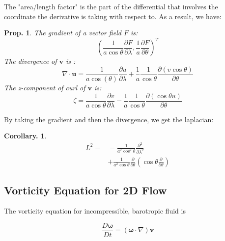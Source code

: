 \documentclass[14pt, twocolumn]{article}
\newtheorem{prop}{Prop.}
\newtheorem{coro}{Corollary.}
\newenvironment{tbox}{
    \begin{tcolorbox}[sharp corners, colback=white]
    
}{
    \end{tcolorbox}
}
\begin{document}
The "area/length factor" is the part of the differential that involves the coordinate the derivative is taking with respect to. 
As a result, we have:
\begin{tbox}
    \begin{prop}
    The gradient of a vector field  $F$ is:
    $$
        \left(\frac{1}{a\cos \theta}\frac{\partial F}{\partial \lambda }, \frac{1}{a}\frac{\partial F}{\partial \theta} \right)^T
    $$
    The divergence of $\mathbf{v}$ is :
    \begin{equation}
    \nabla \cdot \mathbf{u} =\frac{1} {a\cos(\theta)} \frac{\partial u}{\partial \lambda}  + \frac{1}{a}\frac{1}{\cos\theta}\frac{\partial (v\cos\theta)}{\partial \theta}
    \end{equation}
    The z-component of curl of $\mathbf{v}$ is:
    \begin{equation}
        \zeta =  \frac{1}{a\cos \theta}\frac{\partial v}{\partial \lambda } -\frac{1}{a}\frac{1}{\cos \theta}\frac{\partial (\cos \theta u)}{\partial \theta} 
    \end{equation} 
\end{prop}

\end{tbox}
By taking the gradient and then the divergence, we get the laplacian:
\begin{tbox}
    \begin{coro}
        \begin{align*}
            L^2=
                          &= \frac{1}{a^2\cos^2 \theta}\frac{\partial^2}{\partial \lambda^2}  \\
                          &+ \frac{1}{a^2\cos\theta}\frac{\partial }{\partial \theta}\left(\cos  \theta  \frac{\partial}{\partial \theta}\right)
        \end{align*} 
    \end{coro} 
\end{tbox}




\subsection{Vorticity Equation for 2D Flow}
The vorticity equation  for incompressible, barotropic fluid is 

\begin{equation}
    \frac{D\boldsymbol{\omega}}{Dt}=(\boldsymbol{\omega}\cdot \nabla)\boldsymbol{v}
\end{equation}
\end{document}
